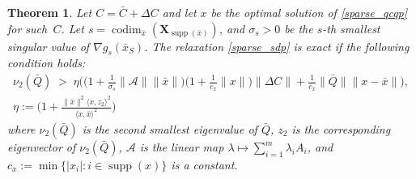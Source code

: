 \documentclass[11pt]{amsart}
\theoremstyle{plain}
\newtheorem{thm}{Theorem}[section]
\theoremstyle{definition}
\theoremstyle{remark}
\newcommand{\vX}{{\mathbf{X}}}
\newcommand{\cA}{{\mathcal{A}}}
\DeclareMathOperator{\codim}{codim}
\DeclareMathOperator{\supp}{supp}
\begin{document}
	\begin{thm}\label{thm:general_exact_region}
		Let $C = \bar C + \Delta C$ and let $x$ be the optimal solution of \eqref{sparse_qcqp} for such~$C$. Let  $s=\codim_{\bar x}(\vX_{\supp(\bar x)})$, and $\sigma_s > 0$ be the $s$-th smallest singular value of \(\nabla g_s(\bar x_S)\). The relaxation \eqref{sparse_sdp} is exact if the following condition holds:
		\begin{equation}\label{eq:exact_region}
			\begin{gathered}
				\nu_2(\bar Q) \;>\;
				\eta \Big(
				\big(1
				+\frac{1}{\sigma_s}\|\cA\|\|\bar x \|\big)\big(1 + \frac{1}{c_{ x}}\| x\|\big)\|\Delta C\|
				+ \frac{1}{c_{ x}}\|\bar Q\|\| x- \bar x\|
				\Big),
				\\
				\eta := \Big(1 + \frac{\|\bar x\|^2\langle  x,z_2\rangle^2}{\langle x, \bar x\rangle^2}\Big)
			\end{gathered}
		\end{equation}
		where $\nu_2(\bar Q)$ is the second smallest eigenvalue of $\bar Q$, $z_2$ is the corresponding eigenvector of $\nu_2(\bar Q)$, \(\cA\) is the linear map \( \lambda \mapsto \sum_{i=1}^m\lambda_iA_i\), and $c_{x}:= \min\{|x_i|: i \in \supp(x)\}$ is a constant. 
	\end{thm}
\end{document}
